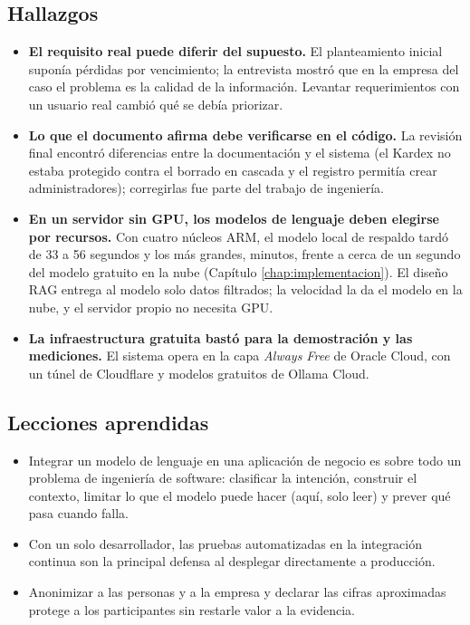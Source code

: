 \subsection{Hallazgos}

\begin{itemize}
    \item \textbf{El requisito real puede diferir del supuesto.} El planteamiento inicial suponía pérdidas por vencimiento; la entrevista mostró que en la empresa del caso el problema es la calidad de la información. Levantar requerimientos con un usuario real cambió qué se debía priorizar.
    \item \textbf{Lo que el documento afirma debe verificarse en el código.} La revisión final encontró diferencias entre la documentación y el sistema (el Kardex no estaba protegido contra el borrado en cascada y el registro permitía crear administradores); corregirlas fue parte del trabajo de ingeniería.
    \item \textbf{En un servidor sin GPU, los modelos de lenguaje deben elegirse por recursos.} Con cuatro núcleos ARM, el modelo local de respaldo tardó de 33 a 56 segundos y los más grandes, minutos, frente a cerca de un segundo del modelo gratuito en la nube (Capítulo \ref{chap:implementacion}). El diseño RAG entrega al modelo solo datos filtrados; la velocidad la da el modelo en la nube, y el servidor propio no necesita GPU.
    \item \textbf{La infraestructura gratuita bastó para la demostración y las mediciones.} El sistema opera en la capa \textit{Always Free} de Oracle Cloud, con un túnel de Cloudflare y modelos gratuitos de Ollama Cloud.
\end{itemize}

\subsection{Lecciones aprendidas}

\begin{itemize}
    \item Integrar un modelo de lenguaje en una aplicación de negocio es sobre todo un problema de ingeniería de software: clasificar la intención, construir el contexto, limitar lo que el modelo puede hacer (aquí, solo leer) y prever qué pasa cuando falla.
    \item Con un solo desarrollador, las pruebas automatizadas en la integración continua son la principal defensa al desplegar directamente a producción.
    \item Anonimizar a las personas y a la empresa y declarar las cifras aproximadas protege a los participantes sin restarle valor a la evidencia.
\end{itemize}

